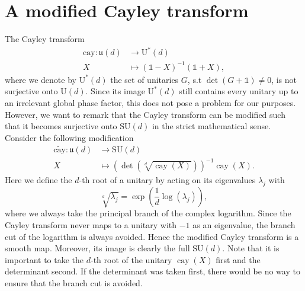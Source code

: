 \documentclass{article}
\begin{document}
\section{A modified Cayley transform}
\label{sec:modified_cayley}
The Cayley transform
\begin{align}
    \mathrm{cay}: \mathfrak{u}(d) &\rightarrow \mathrm{U}^*(d) \\
    X &\mapsto (\mathds{1}-X)^{-1}(\mathds{1} + X),
\end{align}
where we denote by \(\mathrm{U}^*(d)\) the set of unitaries \(G\), s.t \(\det(G + \mathds{1}) \neq 0\), is not surjective onto \(\mathrm{U}(d)\).
Since its image \(\mathrm{U}^*(d)\) still contains every unitary up to an irrelevant global phase factor, this does not pose a problem for our purposes.
However, we want to remark that the Cayley transform can be modified such that it becomes surjective onto \(\mathrm{SU}(d)\) in the strict mathematical sense.
Consider the following modification
\begin{align}
    \widetilde{\mathrm{cay}}: \mathfrak{u}(d) &\rightarrow \mathrm{SU}(d) \\
    X &\mapsto \left(\operatorname{det}\left(\sqrt[d]{\operatorname{cay}(X)}\right)\right)^{-1} \operatorname{cay}(X).
\end{align}
Here we define the \(d\)-th root of a unitary by acting on its eigenvalues \(\lambda_j\) with
\begin{equation}
    \sqrt[d]{\lambda_j} = \exp\left(\frac{1}{d}\log(\lambda_j)\right),
\end{equation}
where we always take the principal branch of the complex logarithm.
Since the Cayley transform never maps to a unitary with \(-1\) as an eigenvalue, the branch cut of the logarithm is always avoided.
Hence the modified Cayley transform is a smooth map.
Moreover, its image is clearly the full \(\mathrm{SU}(d)\).
Note that it is important to take the \(d\)-th root of the unitary \(\operatorname{cay}(X)\) first and the determinant second.
If the determinant was taken first, there would be no way to ensure that the branch cut is avoided.
\end{document}
